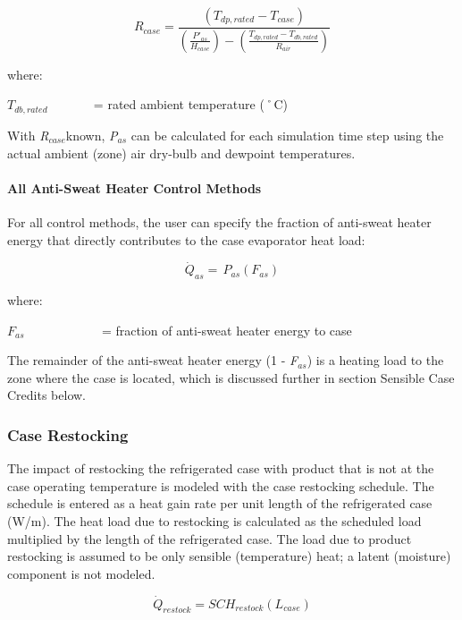 \begin{equation}
{R_{case}} = \frac{{\left( {{T_{dp,rated}} - {T_{case}}} \right)}}{{\left( {\frac{{{P'}_{as}}}{{{H_{case}}}}} \right) - \left( {\frac{{{T_{dp,rated}} - {T_{db,rated}}}}{{{R_{air}}}}} \right)}}
\end{equation}

where:

\({T_{db,rated}}\) ~~~~~~ = rated ambient temperature (˚C)

With \emph{R\(_{case}\)}known, \emph{P\(_{as}\)} can be calculated for each simulation time step using the actual ambient (zone) air dry-bulb and dewpoint temperatures.

\paragraph{All Anti-Sweat Heater Control Methods}\label{all-anti-sweat-heater-control-methods}

For all control methods, the user can specify the fraction of anti-sweat heater energy that directly contributes to the case evaporator heat load:

\begin{equation}
{\dot Q_{as}} = \,{P_{as}}\left( {{F_{as}}} \right)
\end{equation}

where:

\({F_{as}}\) ~~~~~~~~~~~ = fraction of anti-sweat heater energy to case

The remainder of the anti-sweat heater energy (1 - \emph{F\(_{as}\)}) is a heating load to the zone where the case is located, which is discussed further in section Sensible Case Credits below.

\subsubsection{Case Restocking}\label{case-restocking}

The impact of restocking the refrigerated case with product that is not at the case operating temperature is modeled with the case restocking schedule. The schedule is entered as a heat gain rate per unit length of the refrigerated case (W/m). The heat load due to restocking is calculated as the scheduled load multiplied by the length of the refrigerated case. The load due to product restocking is assumed to be only sensible (temperature) heat; a latent (moisture) component is not modeled.

\begin{equation}
{\dot Q_{restock}} = SC{H_{restock}}\left( {{L_{case}}} \right)
\end{equation}

